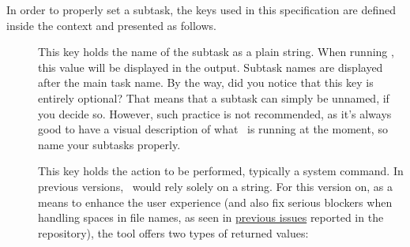 \begin{description}

In order to properly set a subtask, the keys used in this specification are defined inside the  context and presented as follows.

\begin{description}
\item[] This key holds the name of the subtask as a plain string. When running \arara, this value will be displayed in the output. Subtask names are displayed after the main task name. By the way, did you notice that this key is entirely optional? That means that a subtask can simply be unnamed, if you decide so. However, such practice is not recommended, as it's always good to have a visual description of what \arara\ is running at the moment, so name your subtasks properly.

\item[] This key holds the action to be performed, typically a system command. In previous versions, \arara\ would rely solely on a string. For this version on, as a means to enhance the user experience (and also fix serious blockers when handling spaces in file names, as seen in \href{https://gitlab.com/islandoftex/arara/issues}{previous issues} reported in the repository), the tool offers two types of returned values:

\begin{itemize}[label={--}]

%
%


\end{itemize}
\end{description}
\end{description}
